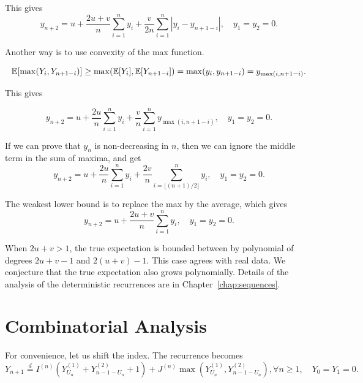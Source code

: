 This gives
\begin{equation}
  \label{eq:lower_bound_difference}
  y_{n+2} = u + \dfrac{2u+v}{n}\sum_{i=1}^{n}y_i + \dfrac{v}{2n}\sum_{i=1}^{n}|y_i - y_{n+1-i}|, \quad y_1=y_2=0.
\end{equation}

Another way is to use convexity of the max function.

$$\mathbb{E}[\max(Y_i, Y_{n+1-i})] \ge \max(\mathbb{E}[Y_i], \mathbb{E}[Y_{n+1-i}]) = \max(y_i, y_{n+1-i}) = y_{\max(i, n+1-i)}.$$

This gives

\begin{equation}
  \label{eq:lower_bound_max}
  y_{n+2} = u + \dfrac{2u}{n}\sum_{i=1}^{n}y_i + \dfrac{v}{n}\sum_{i=1}^{n}y_{\max(i, n+1-i)}, \quad y_1=y_2=0.
\end{equation}

If we can prove that $y_n$ is non-decreasing in $n$, then we can ignore the middle term in the sum of maxima, and get
\begin{equation}
  \label{eq:lower_bound_half_sum}
  y_{n+2} = u + \dfrac{2u}{n}\sum_{i=1}^{n}y_i + \dfrac{2v}{n}\sum_{i=\lfloor (n+1)/2 \rfloor}^{n}y_{i}, \quad y_1=y_2=0.
\end{equation}

The weakest lower bound is to replace the max by the average, which gives
\begin{equation}
  \label{eq:lower_bound_average}
  y_{n+2} = u + \dfrac{2u+v}{n}\sum_{i=1}^{n}y_i, \quad y_1=y_2=0.
\end{equation}

When $2u+v>1$, the true expectation is bounded between by polynomial of degrees $2u+v-1$ and $2(u+v)-1$. This case agrees with real data. We conjecture that the true expectation also grows polynomially. Details of the analysis of the deterministic recurrences are in Chapter~\ref{chap:sequences}.

\section{Combinatorial Analysis}

For convenience, let us shift the index. The recurrence becomes
\begin{equation}
  \label{eq:yield_indicator-shifted}
  Y_{n+1} \stackrel{d}{=} I^{(n)}\left(Y_{U_n}^{(1)} + Y_{n-1-U_n}^{(2)} + 1\right) + J^{(n)}\max\left(Y_{U_n}^{(1)}, Y_{n-1-U_n}^{(2)}\right), \forall n\ge 1, \quad Y_0=Y_1=0.
\end{equation}

